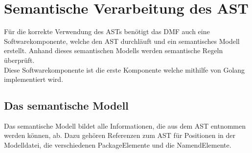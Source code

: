 \documentclass[./einleitung.tex]{subfiles}
\begin{document}
    \section{Semantische Verarbeitung des AST}\label{sec:semantische-verarbeitung-des-ast}
    Für die korrekte Verwendung des ASTs benötigt das DMF auch eine Softwarekomponente,
    welche den AST durchläuft und ein semantisches Modell erstellt.
    Anhand dieses semantischen Modells werden semantische Regeln überprüft. \\

    Diese Softwarekomponente ist die erste Komponente welche mithilfe von Golang implementiert wird.

    \subsection{Das semantische Modell}\label{subsec:das-semantische-modell}
    Das semantische Modell bildet alle Informationen, die aus dem AST entnommen werden können, ab.
    Dazu gehören Referenzen zum AST für Positionen in der Modelldatei, die verschiedenen PackageElemente und die NamendElemente.
\end{document}
